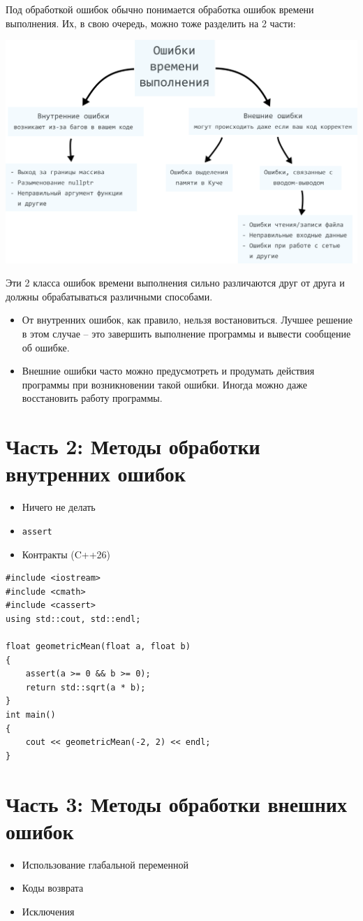 \documentclass{article}
\begin{document}
Под обработкой ошибок обычно понимается обработка ошибок времени выполнения. Их, в свою очередь, можно тоже разделить на 2 части:
\begin{center}
\includegraphics[scale=0.9]{../images/error_types.png}
\end{center}

Эти 2 класса ошибок времени выполнения сильно различаются друг от друга и должны обрабатываться различными способами.

\begin{itemize}
\item От внутренних ошибок, как правило, нельзя востановиться. Лучшее решение в этом случае -- это завершить выполнение программы и вывести сообщение об ошибке.
\item Внешние ошибки часто можно предусмотреть и продумать действия программы при возникновении такой ошибки. Иногда можно даже восстановить работу программы.
\end{itemize}


\newpage
\section*{Часть 2: Методы обработки внутренних ошибок}

\begin{itemize}
\item Ничего не делать
\item \texttt{assert}
\item Контракты (C++26)
\end{itemize}

\begin{lstlisting}
#include <iostream>
#include <cmath>
#include <cassert>
using std::cout, std::endl;

float geometricMean(float a, float b)
{
    assert(a >= 0 && b >= 0);
    return std::sqrt(a * b);
}
int main()
{
    cout << geometricMean(-2, 2) << endl;
}
\end{lstlisting}


\newpage
\section*{Часть 3: Методы обработки внешних ошибок}
\begin{itemize}
\item Использование глабальной переменной
\item Коды возврата
\item Исключения
\end{itemize}
\end{document}
